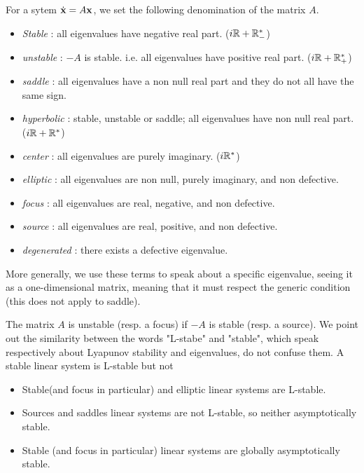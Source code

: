 \begin{definition}
    For a sytem $\dot{\mathbf{x}}=A\mathbf{x}$, we set the following denomination of the matrix $A$.
    \begin{itemize}
    \item \emph{Stable} : all eigenvalues have negative real part. ($i\mathbb{R}+\mathbb{R}^*_-$)
    \item \emph{unstable} : $-A$ is stable. i.e. all eigenvalues have positive real part. ($i\mathbb{R}+\mathbb{R}^*_+$)
    \item \emph{saddle} : all eigenvalues have a non null real part and they do not all have the same sign.
    \item \emph{hyperbolic} : stable, unstable or saddle; \ie all eigenvalues have non null real part. ($i\mathbb{R}+\mathbb{R}^*$)
    \item \emph{center} : all eigenvalues are purely imaginary. ($i\mathbb{R}^*$)
    \item \emph{elliptic} : all eigenvalues are non null, purely imaginary, and non defective.
    \item \emph{focus} : all eigenvalues are real, negative, and non defective.
    \item \emph{source} : all eigenvalues are real, positive, and non defective.
    \item \emph{degenerated} : there exists a defective eigenvalue.
    \end{itemize}
    More generally, we use these terms to speak about a specific eigenvalue, seeing it as a one-dimensional matrix, meaning that it must respect the generic condition (this does not apply to saddle).
\end{definition}
\begin{remarque}
    The matrix $A$ is unstable (resp. a focus) if $-A$ is stable (resp. a source).
    We point out the similarity between the words "L-stabe" and "stable", which speak respectively about Lyapunov stability and eigenvalues, do not confuse them. A stable linear system is L-stable but not 
\end{remarque}
\begin{corollaire}
\quad
\begin{itemize} 
    \item Stable(and focus in particular) and elliptic linear systems are L-stable.
    \item Sources and saddles linear systems are not L-stable, so  neither asymptotically stable.
    \item Stable (and focus in particular) linear systems are globally asymptotically stable.
    \end{itemize} 
\end{corollaire}

